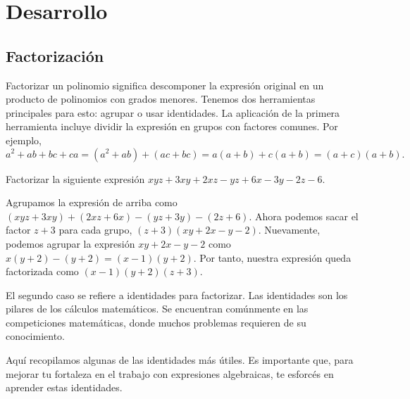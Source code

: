 \section{Desarrollo}

\subsection{Factorización}

Factorizar un polinomio significa descomponer la expresión original en un producto de polinomios con grados menores.
Tenemos dos herramientas principales para esto: agrupar o usar identidades.
La aplicación de la primera herramienta incluye dividir la expresión en grupos con factores comunes.
Por ejemplo,
\[
    a^2 + ab + bc + ca = (a^2 + ab) + (ac + bc) = a(a + b) + c(a + b) = (a + c)(a + b).
\]

\begin{example}
    Factorizar la siguiente expresión $xyz + 3xy + 2xz - yz + 6x - 3y - 2z - 6$.
\end{example}
\begin{solution}
    Agrupamos la expresión de arriba como $(xyz + 3xy) + (2xz + 6x) - (yz + 3y) - (2z + 6)$.
    Ahora podemos sacar el factor $z + 3$ para cada grupo, $(z + 3)(xy + 2x - y - 2)$.
    Nuevamente, podemos agrupar la expresión $xy + 2x - y - 2$ como $x(y + 2) - (y + 2) = (x - 1)(y + 2)$.
    Por tanto, nuestra expresión queda factorizada como $(x - 1)(y + 2)(z + 3)$.
\end{solution}

El segundo caso se refiere a identidades para factorizar.
Las identidades son los pilares de los cálculos matemáticos.
Se encuentran comúnmente en las competiciones matemáticas, donde muchos problemas requieren de su conocimiento.

Aquí recopilamos algunas de las identidades más útiles.
Es importante que, para mejorar tu fortaleza en el trabajo con expresiones algebraicas, te esforcés en aprender estas identidades.

